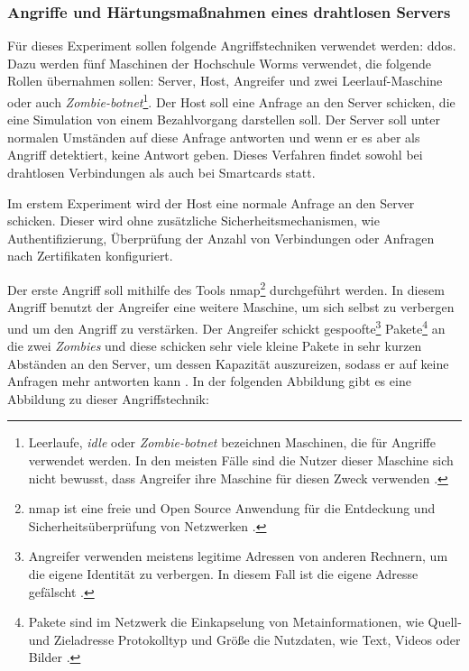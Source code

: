 \subsubsection{Angriffe und Härtungsmaßnahmen eines drahtlosen Servers}
Für dieses Experiment sollen folgende Angriffstechniken verwendet werden: \acrfull{ddos}. Dazu werden fünf Maschinen der Hochschule Worms
verwendet, die folgende Rollen übernahmen sollen: Server, Host, Angreifer und zwei Leerlauf-Maschine oder auch 
\textit{Zombie-botnet}\footnote{Leerlaufe, \textit{idle} oder \textit{Zombie-botnet} bezeichnen Maschinen, die für 
Angriffe verwendet werden. In den meisten Fälle sind die Nutzer dieser Maschine sich nicht bewusst, dass Angreifer ihre
Maschine für diesen Zweck verwenden \cite{refart:XGDD}.}. Der Host soll eine Anfrage an den Server schicken, die
eine Simulation von einem Bezahlvorgang darstellen soll. Der Server soll unter normalen Umständen auf diese Anfrage
antworten und wenn er es aber als Angriff detektiert, keine Antwort geben. Dieses Verfahren findet sowohl bei drahtlosen
Verbindungen als auch bei Smartcards statt.

Im erstem Experiment wird der Host eine normale Anfrage an den Server schicken. Dieser wird ohne zusätzliche 
Sicherheitsmechanismen, wie Authentifizierung, Überprüfung der Anzahl von Verbindungen oder Anfragen nach Zertifikaten 
konfiguriert.

Der erste Angriff soll mithilfe des Tools \acrfull{nmap}\footnote{\acrshort{nmap} ist eine freie und Open Source Anwendung
für die Entdeckung und Sicherheitsüberprüfung von Netzwerken \cite{refst:nmap}.} durchgeführt werden. In diesem Angriff 
benutzt der Angreifer eine weitere Maschine, um sich selbst zu verbergen und um den Angriff zu verstärken. Der Angreifer
schickt gespoofte\footnote{Angreifer verwenden meistens legitime Adressen von anderen Rechnern, um die eigene Identität
zu verbergen. In diesem Fall ist die eigene Adresse gefälscht \cite{refst:IPIO}.} Pakete\footnote{Pakete sind im Netzwerk
die Einkapselung von Metainformationen, wie Quell-und Zieladresse Protokolltyp und Größe die Nutzdaten, wie Text, 
Videos oder Bilder \cite{refbook:SWIS}.} an die zwei \textit{Zombies} und diese schicken sehr viele kleine Pakete in sehr
kurzen Abständen an den Server, um dessen Kapazität auszureizen, sodass er auf keine Anfragen mehr antworten kann 
\cite{refip:KSDD}. In der folgenden Abbildung gibt es eine Abbildung zu dieser Angriffstechnik:

